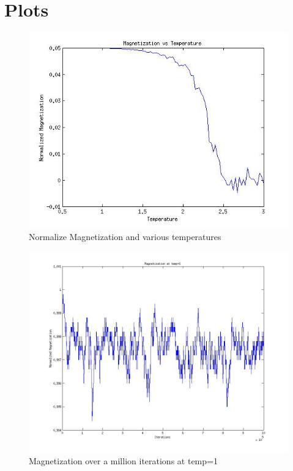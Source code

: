 \documentclass[]{article}
\begin{document}
\section{Plots} 
    \begin{figure}[b]
      \centering
      \includegraphics{figures/mag_vs_temp.jpg}
      \caption{\label{fig:mag_vs_temp}Normalize Magnetization and various temperatures}
    \end{figure}

    
    \begin{figure}[b]
      \centering
      \includegraphics{figures/mag_t1.jpg}
      \caption{\label{fig:mag_T1p} Magnetization over a million iterations at temp=1}
    \end{figure}
    
\end{document}
